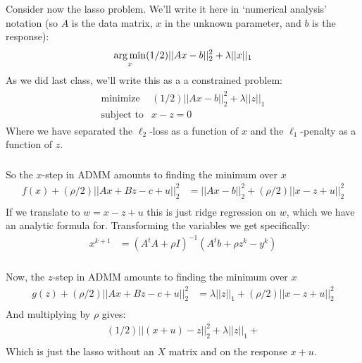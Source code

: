 \begin{frame}[fragile] \frametitle{}

Consider now the lasso problem. We'll write it here in `numerical analysis'
notation (so $A$ is the data matrix, $x$ in the unknown parameter, and $b$ is
the response):
\begin{align*}
\mathop{\mathrm{arg\,min}}_x (1/2) || A x - b ||_2^2 + \lambda || x ||_1
\end{align*}
As we did last class, we'll write this as a a constrained problem:
\begin{align*}
\begin{array}{ll}
\text{minimize} & (1/2) || A x - b ||_2^2 + \lambda || z ||_1 \\
\text{subject to} & x - z = 0
\end{array}
\end{align*}
Where we have separated the $\ell_2$-loss as a function of $x$ and the
$\ell_1$-penalty as a function of $z$.

\end{frame}

\begin{frame}[fragile] \frametitle{}

So the $x$-step in ADMM amounts to finding the minimum over $x$
\begin{align*}
f(x) + (\rho / 2) || Ax + Bz - c + u ||_2^2
&= ||A x - b ||_2^2 + (\rho / 2) || x - z + u ||_2^2 \\
\end{align*}
\pause If we translate to $w = x - z + u$ this is just ridge regression
on $w$, which we have an analytic formula for. Transforming the variables
we get specifically:
\begin{align*}
x^{k+1} &= (A^t A + \rho I)^{-1}  (A^t b + \rho z^k - y^k)
\end{align*}

\end{frame}


\begin{frame}[fragile] \frametitle{}

Now, the $z$-step in ADMM amounts to finding the minimum over $x$
\begin{align*}
g(z) + (\rho / 2) || Ax + Bz - c + u ||_2^2
&= \lambda || z ||_1 + (\rho / 2) || x - z + u ||_2^2 \\
\end{align*}
And multiplying by $\rho$ gives:
\begin{align*}
(1 / 2) || (x + u) - z ||_2^2 + \lambda || z ||_1 +  \\
\end{align*}
Which is just the lasso without an $X$ matrix and on the response $x + u$.

\end{frame}

